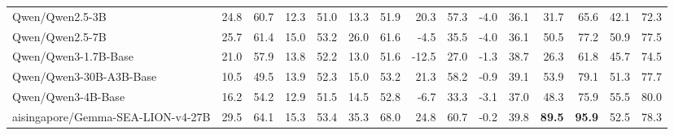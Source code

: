 \documentclass{article}
\begin{document}
\begin{table}[htbp]
\begin{threeparttable}
\begin{adjustbox}{max width=\textwidth}
\begin{tabular}{lrrrrrrrrrrrrrr}
Qwen/Qwen2.5-3B & \cellcolor[HTML]{BBDAEA}24.8 & \cellcolor[HTML]{B5D7E8}60.7 & \cellcolor[HTML]{C4DFED}12.3 & \cellcolor[HTML]{C1DEEC}51.0 & \cellcolor[HTML]{FDF6F3}13.3 & \cellcolor[HTML]{FCFDFE}51.9 & \cellcolor[HTML]{D1E6F1}20.3 & \cellcolor[HTML]{C5E0ED}57.3 & \cellcolor[HTML]{F4A582}-4.0 & \cellcolor[HTML]{F4A582}36.1 & \cellcolor[HTML]{FBDED2}31.7 & \cellcolor[HTML]{FDEFE9}65.6 & \cellcolor[HTML]{F0F7FA}42.1 & \cellcolor[HTML]{DAEBF3}72.3 \\
Qwen/Qwen2.5-7B & \cellcolor[HTML]{B5D7E8}25.7 & \cellcolor[HTML]{AFD4E7}61.4 & \cellcolor[HTML]{9DCAE1}15.0 & \cellcolor[HTML]{9CCAE1}53.2 & \cellcolor[HTML]{C6E0ED}26.0 & \cellcolor[HTML]{BDDCEB}61.6 & \cellcolor[HTML]{F7C4AD}-4.5 & \cellcolor[HTML]{F8CBB7}35.5 & \cellcolor[HTML]{F4A582}-4.0 & \cellcolor[HTML]{F4A582}36.1 & \cellcolor[HTML]{F5FAFC}50.5 & \cellcolor[HTML]{E0EEF5}77.2 & \cellcolor[HTML]{D9EAF3}50.9 & \cellcolor[HTML]{C6E1ED}77.5 \\
Qwen/Qwen3-1.7B-Base & \cellcolor[HTML]{D2E7F1}21.0 & \cellcolor[HTML]{CAE2EF}57.9 & \cellcolor[HTML]{AED4E6}13.8 & \cellcolor[HTML]{ACD3E6}52.2 & \cellcolor[HTML]{FDF5F1}13.0 & \cellcolor[HTML]{FEFEFE}51.6 & \cellcolor[HTML]{F4A582}-12.5 & \cellcolor[HTML]{F4A582}27.0 & \cellcolor[HTML]{FDEFE9}-1.3 & \cellcolor[HTML]{FDF1EB}38.7 & \cellcolor[HTML]{F9D3C1}26.3 & \cellcolor[HTML]{FBE2D6}61.8 & \cellcolor[HTML]{E6F2F7}45.7 & \cellcolor[HTML]{D2E7F1}74.5 \\
Qwen/Qwen3-30B-A3B-Base & \cellcolor[HTML]{FCEDE7}10.5 & \cellcolor[HTML]{FDF6F3}49.5 & \cellcolor[HTML]{ACD3E5}13.9 & \cellcolor[HTML]{AAD2E5}52.3 & \cellcolor[HTML]{FEFDFD}15.0 & \cellcolor[HTML]{F3F9FB}53.2 & \cellcolor[HTML]{CBE3EF}21.3 & \cellcolor[HTML]{C1DEEC}58.2 & \cellcolor[HTML]{FEFBFA}-0.9 & \cellcolor[HTML]{FEFDFD}39.1 & \cellcolor[HTML]{EDF5F9}53.9 & \cellcolor[HTML]{D8EAF3}79.1 & \cellcolor[HTML]{D8EAF3}51.3 & \cellcolor[HTML]{C5E0ED}77.7 \\
Qwen/Qwen3-4B-Base & \cellcolor[HTML]{F0F7FA}16.2 & \cellcolor[HTML]{E5F1F7}54.2 & \cellcolor[HTML]{BBDBEA}12.9 & \cellcolor[HTML]{B9D9E9}51.5 & \cellcolor[HTML]{FEFBFA}14.5 & \cellcolor[HTML]{F6FAFC}52.8 & \cellcolor[HTML]{F6BBA1}-6.7 & \cellcolor[HTML]{F7C1A9}33.3 & \cellcolor[HTML]{F7BDA4}-3.1 & \cellcolor[HTML]{F7BEA5}37.0 & \cellcolor[HTML]{FBFDFE}48.3 & \cellcolor[HTML]{E6F1F7}75.9 & \cellcolor[HTML]{CDE4F0}55.5 & \cellcolor[HTML]{BDDBEB}80.0 \\
aisingapore/Gemma-SEA-LION-v4-27B & \cellcolor[HTML]{9DCBE1}29.5 & \cellcolor[HTML]{9BCAE0}64.1 & \cellcolor[HTML]{98C8DF}15.3 & \cellcolor[HTML]{98C8DF}53.4 & \cellcolor[HTML]{95C6DF}35.3 & \cellcolor[HTML]{94C6DE}68.0 & \cellcolor[HTML]{BBDBEA}24.8 & \cellcolor[HTML]{B3D6E8}60.7 & \cellcolor[HTML]{ECF5F9}-0.2 & \cellcolor[HTML]{EAF3F8}39.8 & \cellcolor[HTML]{92C5DE}\textbf{89.5} & \cellcolor[HTML]{92C5DE}\textbf{95.9} & \cellcolor[HTML]{D5E8F2}52.5 & \cellcolor[HTML]{C3DFEC}78.3 \\

\end{tabular}
\end{adjustbox}
\end{threeparttable}
\end{table}
\end{document}
